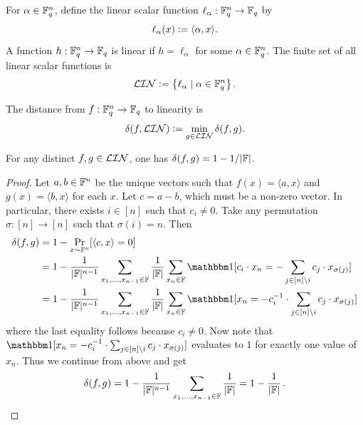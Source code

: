 \begin{definition}
\label{def:linear-functions}
\leanok
For $\alpha\in{\mathbb F}_q^n$, define the linear scalar function
$\ell_\alpha:{\mathbb F}_q^n\to{\mathbb F}_q$ by
\[
    \ell_\alpha(x) \mathrel{\mathop:}= \langle \alpha, x \rangle.
\]
A function $h:{\mathbb F}_q^n\to{\mathbb F}_q$ is linear if $h=\ell_\alpha$ for some
$\alpha\in{\mathbb F}_q^n$. The finite set of all linear scalar functions is
\[
    \mathcal{LIN}
    \mathrel{\mathop:}=
    \left\{\ell_\alpha \mid \alpha\in{\mathbb F}_q^n\right\}.
\]
\end{definition}

\begin{definition}
\label{def:distance-to-linearity}
\leanok
The distance from $f:{\mathbb F}_q^n\to{\mathbb F}_q$ to linearity is
\[
    \delta(f,\mathcal{LIN}) \mathrel{\mathop:}= \min_{g\in\mathcal{LIN}}\delta(f,g).
\]
\end{definition}



\begin{lemma}
\label{lem:linear-set-well-separated}
\leanok
For any distinct $f,g \in \mathcal{LIN}$, one has $\delta(f,g)= 1-1/|{\mathbb F}|$.
\end{lemma}
\begin{proof}\leanok
Let $a,b \in {\mathbb F}^n$ be the unique vectors such that $f(x) = \langle a, x\rangle$ and $g(x) = \langle b, x\rangle$ for each $x$.
Let $c = a-b$, which must be a non-zero vector. In particular, there exists $i \in [n]$ such that $c_i \neq 0$. Take any permutation $\sigma: [n] \rightarrow [n]$ such that $\sigma(i)=n$. Then
\begin{align*}
    \delta(f,g) & = 1- \Pr_{x \sim \bbF^n}[\langle c, x\rangle =0] \\
    & = 1 - \frac{1}{|\bbF|^{n-1}}\sum_{x_1,\dots,x_{n-1} \in \bbF}\frac{1}{|\bbF|}\sum_{x_n \in \bbF} \ind[c_i \cdot x_n = -\sum_{j \in [n]\setminus {i}} c_j \cdot x_{\sigma(j)}] \\
    & = 1 - \frac{1}{|\bbF|^{n-1}}\sum_{x_1,\dots,x_{n-1} \in \bbF}\frac{1}{|\bbF|}\sum_{x_n \in \bbF} \ind[x_n = -c_i^{-1} \cdot \sum_{j \in [n]\setminus {i}} c_j \cdot x_{\sigma(j)}] 
\end{align*}
where the last equality follows because $c_i \neq 0$. Now note that  $\ind[x_n = -c_i^{-1} \cdot \sum_{j \in [n]\setminus {i}} c_j \cdot x_{\sigma(j)}]$ evaluates to $1$ for exactly one value of $x_n$. Thus we continue from above and get
\begin{align*}
    \delta(f,g) = 1-\frac{1}{|{\mathbb F}|^{n-1}}\sum_{x_1,\dots,x_{n-1} \in {\mathbb F}}\frac{1}{|{\mathbb F}|} = 1-\frac{1}{|{\mathbb F}|} \, .
\end{align*}
\end{proof}


